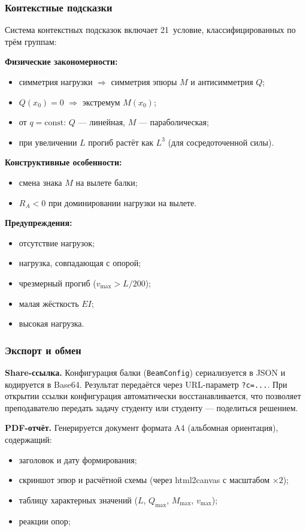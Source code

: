 \subsubsection{Контекстные подсказки}

Система контекстных подсказок включает 21~условие, классифицированных по трём группам:

\textbf{Физические закономерности:}
\begin{itemize}
  \item симметрия нагрузки $\Rightarrow$ симметрия эпюры $M$ и антисимметрия $Q$;
  \item $Q(x_0) = 0$ $\Rightarrow$ экстремум $M(x_0)$;
  \item от $q = \text{const}$: $Q$ --- линейная, $M$ --- параболическая;
  \item при увеличении $L$ прогиб растёт как $L^3$ (для сосредоточенной силы).
\end{itemize}

\textbf{Конструктивные особенности:}
\begin{itemize}
  \item смена знака $M$ на вылете балки;
  \item $R_A < 0$ при доминировании нагрузки на вылете.
\end{itemize}

\textbf{Предупреждения:}
\begin{itemize}
  \item отсутствие нагрузок;
  \item нагрузка, совпадающая с опорой;
  \item чрезмерный прогиб ($v_{\max} > L/200$);
  \item малая жёсткость $EI$;
  \item высокая нагрузка.
\end{itemize}

\subsubsection{Экспорт и обмен}

\textbf{Share-ссылка.} Конфигурация балки (\texttt{BeamConfig}) сериализуется в JSON и кодируется в Base64. Результат передаётся через URL-параметр \texttt{?c=...}. При открытии ссылки конфигурация автоматически восстанавливается, что позволяет преподавателю передать задачу студенту или студенту --- поделиться решением.

\textbf{PDF-отчёт.} Генерируется документ формата A4 (альбомная ориентация), содержащий:
\begin{itemize}
  \item заголовок и дату формирования;
  \item скриншот эпюр и расчётной схемы (через html2canvas с масштабом $\times 2$);
  \item таблицу характерных значений ($L$, $Q_{\max}$, $M_{\max}$, $v_{\max}$);
  \item реакции опор;
\end{itemize}


